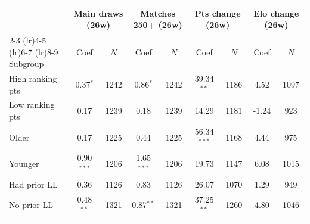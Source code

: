 \begin{tabular}{l cc cc cc cc}
\toprule
 & \multicolumn{2}{c}{Main draws (26w)} & \multicolumn{2}{c}{Matches 250+ (26w)} & \multicolumn{2}{c}{Pts change (26w)} & \multicolumn{2}{c}{Elo change (26w)} \\
\cmidrule(lr){2-3} \cmidrule(lr){4-5} \cmidrule(lr){6-7} \cmidrule(lr){8-9}
Subgroup & Coef & $N$ & Coef & $N$ & Coef & $N$ & Coef & $N$ \\
\midrule
High ranking pts & 0.37$^{*}$ & 1242 & 0.86$^{*}$ & 1242 & 39.34$^{**}$ & 1186 & 4.52 & 1097 \\
Low ranking pts & 0.17 & 1239 & 0.18 & 1239 & 14.29 & 1181 & -1.24 & 923 \\
Older & 0.17 & 1225 & 0.44 & 1225 & 56.34$^{***}$ & 1168 & 4.44 & 975 \\
Younger & 0.90$^{***}$ & 1206 & 1.65$^{***}$ & 1206 & 19.73 & 1147 & 6.08 & 1015 \\
Had prior LL & 0.36 & 1126 & 0.83 & 1126 & 26.07 & 1070 & 1.29 & 949 \\
No prior LL & 0.48$^{**}$ & 1321 & 0.87$^{**}$ & 1321 & 37.25$^{**}$ & 1260 & 4.80 & 1046 \\
\bottomrule
\end{tabular}

